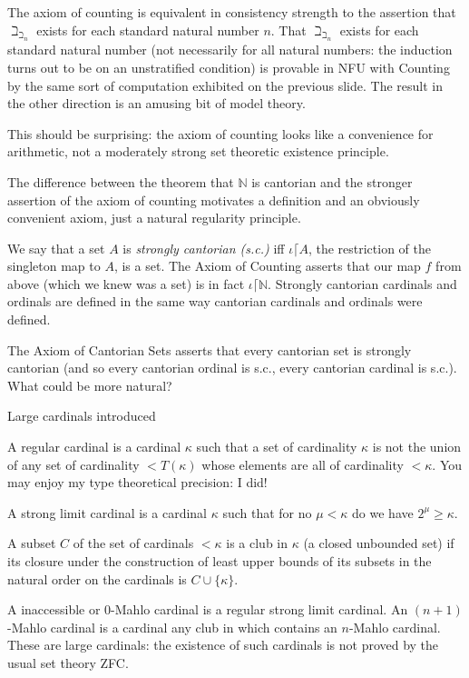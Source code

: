 \documentclass{slides}
\begin{document}
\begin{slide}

The axiom of counting is equivalent in consistency strength to the assertion that $\beth_{\beth _n}$ exists for each standard natural number $n$.  That $\beth_{\beth _n}$ exists for each standard natural number (not necessarily for all natural numbers:  the induction turns out to be on an unstratified condition) is provable in NFU with Counting by the same sort of computation exhibited on the previous slide.  The result in the other direction is an amusing bit of model theory.

This should be surprising:  the axiom of counting looks like a convenience for arithmetic, not a moderately strong set theoretic existence principle.

\end{slide}

\begin{slide}

The difference between the theorem that $\mathbb N$ is cantorian and the stronger assertion of the axiom of counting motivates a definition and an obviously convenient axiom, just a natural regularity principle.

We say that a set $A$ is {\em strongly cantorian (s.c.)\/} iff $\iota \lceil A$, the restriction of the singleton map to $A$, is a set.  The Axiom of Counting asserts that our map $f$ from above (which we knew was a set) is in fact $\iota \lceil \mathbb N$.  Strongly cantorian cardinals and ordinals are defined in the same way cantorian cardinals and ordinals were defined.

The Axiom of Cantorian Sets asserts that every cantorian set is strongly cantorian (and so every cantorian ordinal is s.c., every cantorian cardinal is s.c.).  What could be more natural?

\end{slide}

\begin{slide}

{\Large Large cardinals introduced}

A regular cardinal is a cardinal $\kappa$ such that a set of cardinality $\kappa$ is not the union of any set of cardinality $<T(\kappa)$ whose elements are all of cardinality $<\kappa$.  You may enjoy my type theoretical precision:  I did!

A strong limit cardinal is a cardinal $\kappa$ such that for no $\mu <\kappa$ do we have $2^{\mu} \geq \kappa$.

A subset $C$ of the set of cardinals $<\kappa$ is a club in $\kappa$ (a closed unbounded set) if its closure under the construction of least upper bounds of its subsets
in the natural order on the cardinals is $C \cup \{\kappa\}$.

A inaccessible or 0-Mahlo cardinal is a regular strong limit cardinal.  An $(n+1)$-Mahlo cardinal is a cardinal any club in which contains an $n$-Mahlo cardinal.  These are large cardinals:  the existence of such cardinals is not proved by the usual set theory ZFC.

\end{slide}
\end{document}
